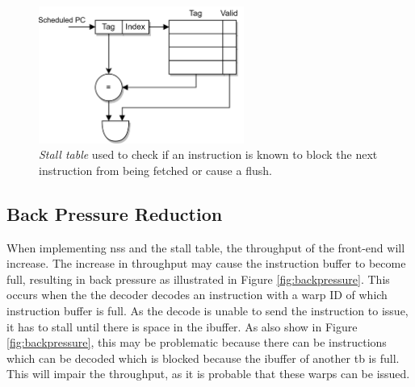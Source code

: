 \begin{figure}
    \centering
    \includegraphics[width=0.6\textwidth]{figures/stall_table.png}
    \caption[Illustration of the stall table.]{\textit{Stall table} used to check if an instruction is known to block the next instruction from being fetched or cause a flush.}
    \label{fig:stall_table}
\end{figure}






\subsection{Back Pressure Reduction}

When implementing \acrshort{nss} and the stall table, the throughput of the front-end will increase. The increase in throughput may cause the instruction buffer to become full, resulting in back pressure as illustrated in Figure \ref{fig:backpressure}. This occurs when the the decoder decodes an instruction with a warp ID of which instruction buffer is full. As the decode is unable to send the instruction to issue, it has to stall until there is space in the ibuffer. As also show in Figure \ref{fig:backpressure}, this may be problematic because there can be instructions which can be decoded which is blocked because the ibuffer of another \acrshort{tb} is full. This will impair the throughput, as it is probable that these warps can be issued.

